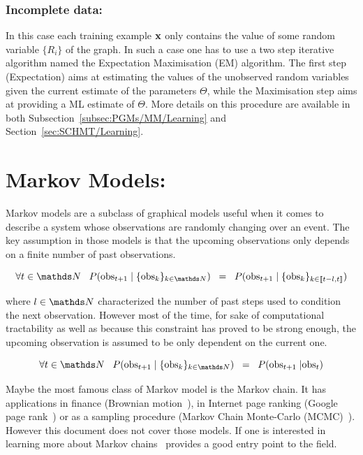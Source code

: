 \documentclass[a4paper,11pt]{report}
\begin{document}
      \subsubsection{Incomplete data:}

				In this case each training example ${\bf x}$ only contains the value of some random variable $\{R_{i}\}$ of the graph. In such a case one has to use a two step iterative algorithm named the Expectation Maximisation (EM) algorithm. The first step (Expectation) aims at estimating the values of the unobserved random variables given the current estimate of the parameters $\Theta$, while the Maximisation step aims at providing a ML estimate of $\Theta$. More details on this procedure are available in both Subsection~\ref{subsec:PGMs/MM/Learning} and Section~\ref{sec:SCHMT/Learning}.
				
  \section{Markov Models:}
    \label{sec:PGMs/MM}
    Markov models are a subclass of graphical models useful when it comes to describe a system whose observations are randomly changing over an event. The key assumption in those models is that the upcoming observations only depends on a finite number of past observations.
    
    \begin{equation}
      \forall t \in \dsN \;\;\; P(\text{obs}_{t+1} \; | \; \{\text{obs}_{k}\}_{k \in \dsN}) \;\; = \;\; P(\text{obs}_{t+1} \; | \; \{\text{obs}_{k}\}_{k \in \llbracket t-l, t \rrbracket})
      \label{eq:MM assumtion v1}
    \end{equation}
    
    where $l \in \dsN$ characterized the number of past steps used to condition the next observation. However most of the time, for sake of computational tractability as well as because this constraint has proved to be strong enough, the upcoming observation is assumed to be only dependent on the current one.  

    \begin{equation}
      \forall t \in \dsN \;\;\; P(\text{obs}_{t+1} \; | \; \{\text{obs}_{k}\}_{k \in \dsN}) \;\; = \;\; P(\text{obs}_{t+1} \; | \text{obs}_{t})
      \label{eq:MM assumtion v2}
    \end{equation}
    
    Maybe the most famous class of Markov model is the Markov chain. It has applications in finance (Brownian motion~\citep{duncan2000stochastic}), in Internet page ranking (Google page rank~\citep{haveliwala2003second}) or as a sampling procedure (Markov Chain Monte-Carlo (MCMC)~\citep{gilks2005markov}). However this document does not cover those models. If one is interested in learning more about Markov chains~\citep{kemeny1960finite} provides a good entry point to the field.\\
    
\end{document}
